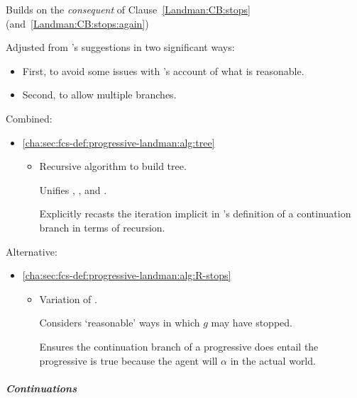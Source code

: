 \begin{note}
\begin{itemize}[noitemsep]
\begin{itemize}
      Builds on the \emph{consequent} of Clause~\ref{Landman:CB:stops} (and~\ref{Landman:CB:stops:again})

      Adjusted from \citeauthor{Landman:1992wh}'s suggestions in two significant ways:
      \begin{itemize}[noitemsep]
      \item
        First, to avoid some issues with \citeauthor{Landman:1992wh}'s account of what is reasonable.
      \item
        Second, to allow multiple branches.
      \end{itemize}
    \end{itemize}
  \end{itemize}
  Combined:
  \begin{itemize}
  \item
    \hfill%
    \autoref{cha:sec:fcs-def:progressive-landman:alg:tree}
    \begin{itemize}
    \item
      Recursive algorithm to build tree.

      Unifies \AlgAC{}, \AlgGetStops{}, and \AlgFindBranches{}.

      Explicitly recasts the iteration implicit in \citeauthor{Landman:1992wh}'s definition of a continuation branch in terms of recursion.
    \end{itemize}
  \end{itemize}
  Alternative:
  \begin{itemize}
  \item
    \hfill%
    \autoref{cha:sec:fcs-def:progressive-landman:alg:R-stops}
    \begin{itemize}
    \item
      Variation of \AlgGetStops{}.

      Considers `reasonable' ways in which \(g\) may have stopped.

      Ensures the continuation branch of a progressive does entail the progressive is true because the agent will \(\alpha\) in the actual world.
    \end{itemize}
  \end{itemize}
\end{note}

\subparagraph{Continuations}
\label{cha:sec:fcs-def:progressive-landman:alg:conts}

